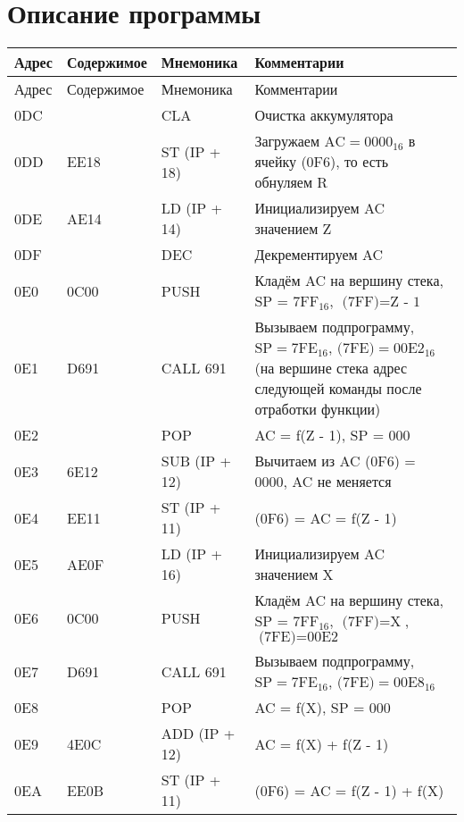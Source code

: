 \section{Описание программы}
\begin{longtable}{|>{\centering\arraybackslash}p{1cm}|>{\centering\arraybackslash}p{3cm}|>{\centering\arraybackslash}p{3cm}|>{\arraybackslash}p{8cm}|}
\hline
Адрес & Содержимое & Мнемоника & Комментарии \\
\hline
\endfirsthead

\hline
Адрес & Содержимое & Мнемоника & Комментарии \\
\hline
\endhead

\hline
\endfoot

\hline
\endlastfoot
0DC & 0200 & CLA & Очистка аккумулятора  \\\hline
0DD & EE18 & ST (IP + 18) & Загружаем $\text{AC} = 0000_{16}$ в ячейку (0F6), то есть обнуляем R \\\hline
0DE & AE14 & LD (IP + 14) & Инициализируем AC значением Z \\\hline
0DF & 0740 & DEC & Декрементируем AC \\\hline
0E0 & 0C00 & PUSH & Кладём AC на вершину стека, $\text{SP = }7\text{FF}_{16}$, $\text{(7FF)} = \text{Z - 1}$ \\\hline
0E1 & D691 & CALL 691 & Вызываем подпрограмму, $\text{SP} = 7\text{FE}_{16}$, 
$\text{(7FE)} = 00\text{E}2_{16}$ (на вершине стека адрес следующей команды после отработки функции) \\\hline
0E2 & 0800 & POP & AC = f(Z - 1), SP = 000 \\\hline
0E3 & 6E12 & SUB (IP + 12) & Вычитаем из AC (0F6) = 0000, AC не меняется \\\hline
0E4 & EE11 & ST (IP + 11) & (0F6) = AC = f(Z - 1) \\\hline
0E5 & AE0F & LD (IP + 16) & Инициализируем AC значением X \\\hline
0E6 & 0C00 & PUSH & Кладём AC на вершину стека, $\text{SP = }7\text{FF}_{16}$, $\text{(7FF)} = \text{X}$, $\text{(7FE)} = \text{00E2}$  \\\hline
0E7 & D691 & CALL 691 & Вызываем подпрограмму, $\text{SP} = 7\text{FE}_{16}$, 
$\text{(7FE)} = 00\text{E}8_{16}$ \\\hline
0E8 & 0800 & POP & AC = f(X), SP = 000 \\\hline
0E9 & 4E0C & ADD (IP + 12) & AC = f(X) + f(Z - 1) \\\hline
0EA & EE0B & ST (IP + 11) & (0F6) = AC = f(Z - 1) + f(X) \\\hline

\end{longtable}
